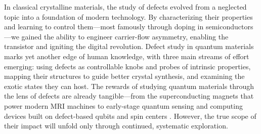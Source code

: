 In classical crystalline materials, the study of defects evolved from a neglected topic into a foundation of modern technology. By characterizing their properties and learning to control them—most famously through doping in semiconductors—we gained the ability to engineer carrier-flow asymmetry, enabling the transistor and igniting the digital revolution. Defect study in quantum materials marks yet another edge of human knowledge, with three main streams of effort emerging: using defects as controllable knobs and probes of intrinsic properties, mapping their structures to guide better crystal synthesis, and examining the exotic states they can host. The rewards of studying quantum materials through the lens of defects are already tangible—from the superconducting magnets that power modern MRI machines \cite{larbalestierNewDevelopmentsNiobium1995} to early-stage quantum sensing and computing devices built on defect-based qubits and spin centers \cite{degenQuantumSensing2017,weberQuantumComputingDefects2010}. However, the true scope of their impact will unfold only through continued, systematic exploration. 

